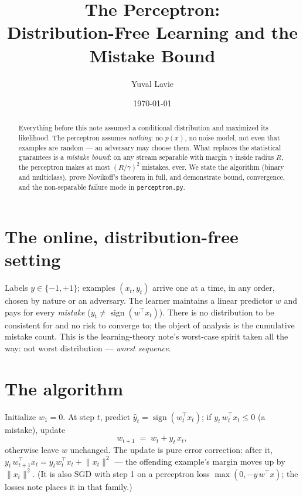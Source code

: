 \documentclass[11pt]{article}
\title{The Perceptron:\\
Distribution-Free Learning and the Mistake Bound}
\author{Yuval Lavie}
\date{\today}
\begin{document}
\maketitle

\begin{abstract}
Everything before this note assumed a conditional distribution and
maximized its likelihood. The perceptron assumes \emph{nothing}: no
$p(x)$, no noise model, not even that examples are random --- an
adversary may choose them. What replaces the statistical guarantees is a
\emph{mistake bound}: on any stream separable with margin $\gamma$ inside
radius $R$, the perceptron makes at most $(R/\gamma)^2$ mistakes, ever.
We state the algorithm (binary and multiclass), prove Novikoff's theorem
in full, and demonstrate bound, convergence, and the non-separable
failure mode in \texttt{perceptron.py}.
\end{abstract}

\section{The online, distribution-free setting}

Labels $y \in \{-1,+1\}$; examples $(x_t, y_t)$ arrive one at a time, in
any order, chosen by nature or an adversary. The learner maintains a
linear predictor $w$ and pays for every \emph{mistake}
($y_t \ne \operatorname{sign}(w^\top x_t)$). There is no distribution to
be consistent for and no risk to converge to; the object of analysis is
the cumulative mistake count. This is the learning-theory note's
worst-case spirit taken all the way: not worst distribution ---
\emph{worst sequence}.

\section{The algorithm}

Initialize $w_1 = 0$. At step $t$, predict
$\hat y_t = \operatorname{sign}(w_t^\top x_t)$; if
$y_t\, w_t^\top x_t \le 0$ (a mistake), update
\begin{equation}
  w_{t+1} \;=\; w_t + y_t\, x_t ,
  \label{eq:update}
\end{equation}
otherwise leave $w$ unchanged. The update is pure error correction:
after it, $y_t\, w_{t+1}^\top x_t = y_t w_t^\top x_t + \lVert
x_t\rVert^2$ --- the offending example's margin moves up by
$\lVert x_t\rVert^2$. (It is also SGD with step 1 on a perceptron loss
$\max(0, -y\,w^\top x)$; the losses note places it in that family.)
\end{document}
